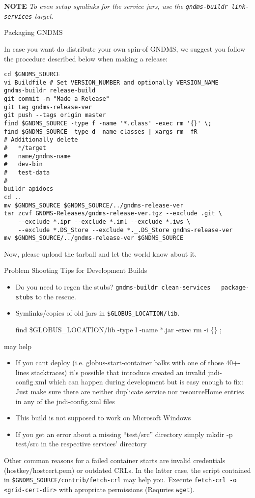\documentclass{article}
\begin{document}
\textbf{NOTE}
\emph{To even setup symlinks for the service jars, use the \texttt{gndms-buildr link-services} target.}

Packaging GNDMS

In case you want do distribute your own spin-of GNDMS, we suggest
you follow the procedure described below when making a release:

\begin{verbatim}
cd $GNDMS_SOURCE
vi Buildfile # Set VERSION_NUMBER and optionally VERSION_NAME
gndms-buildr release-build
git commit -m "Made a Release"
git tag gndms-release-ver
git push --tags origin master
find $GNDMS_SOURCE -type f -name '*.class' -exec rm '{}' \;
find $GNDMS_SOURCE -type d -name classes | xargs rm -fR
# Additionally delete 
#   */target 
#   name/gndms-name
#   dev-bin
#   test-data
# 
buildr apidocs
cd ..
mv $GNDMS_SOURCE $GNDMS_SOURCE/../gndms-release-ver
tar zcvf GNDMS-Releases/gndms-release-ver.tgz --exclude .git \
    --exclude *.ipr --exclude *.iml --exclude *.iws \
    --exclude *.DS_Store --exclude *._.DS_Store gndms-release-ver
mv $GNDMS_SOURCE/../gndms-release-ver $GNDMS_SOURCE
\end{verbatim}

Now, please upload the tarball and let the world know about it.

Problem Shooting Tips for Development Builds

\begin{itemize}
\item
  Do you need to regen the stubs?
  \verb!gndms-buildr clean-services   package-stubs! to the rescue.

\item
  Symlinks/copies of old jars in \verb!$GLOBUS_LOCATION/lib!.

  find \$GLOBUS\_LOCATION/lib -type l -name *.jar -exec rm -i \{\} ;

\end{itemize}
may help

\begin{itemize}
\item
  If you cant deploy (i.e. globus-start-container balks with one of
  those 40+-lines stacktraces) it's possible that introduce created
  an invalid jndi-config.xml which can happen during development but
  is easy enough to fix: Just make sure there are neither duplicate
  service nor resourceHome entries in any of the jndi-config.xml
  files

\item
  This build is not supposed to work on Microsoft Windows

\item
  If you get an error about a missing ``test/src'' directory simply
  mkdir -p test/src in the respective services' directory

\end{itemize}
Other common reasons for a failed container starts are invalid
credentials (hostkey/hostcert.pem) or outdated CRLs. In the latter
case, the script contained in
\verb!$GNDMS_SOURCE/contrib/fetch-crl! may help you. Execute
\verb!fetch-crl -o <grid-cert-dir>! with apropriate permissions
(Requries \verb!wget!).
\end{document}
